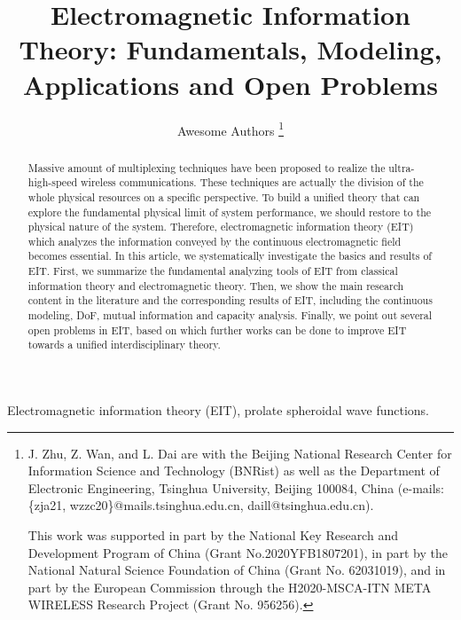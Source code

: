 \documentclass[journal,twocolumn]{IEEEtran}
\begin{document}
\title{Electromagnetic Information Theory: Fundamentals, Modeling, Applications and Open Problems}

\author{{Awesome Authors}
\thanks{J. Zhu, Z. Wan, and L. Dai are with the Beijing National Research Center for Information Science and Technology (BNRist) as well as the Department of Electronic Engineering, Tsinghua University, Beijing 100084, China (e-mails: \{zja21, wzzc20\}@mails.tsinghua.edu.cn, daill@tsinghua.edu.cn).

This work was supported in part by the National Key Research and Development Program of China (Grant No.2020YFB1807201), in part by the National Natural Science Foundation of China (Grant No. 62031019), and in part by the European Commission through the H2020-MSCA-ITN META WIRELESS Research Project (Grant No. 956256).}
}

\maketitle

\begin{abstract}
   Massive amount of multiplexing techniques have been proposed to realize the ultra-high-speed wireless communications. These techniques are actually the division of the whole physical resources on a specific perspective. To build a unified theory that can explore the fundamental physical limit of system performance, we should restore to the physical nature of the system. Therefore, electromagnetic information theory (EIT) which analyzes the information conveyed by the continuous electromagnetic field becomes essential. In this article, we systematically investigate the basics and results of EIT. First, we summarize the fundamental analyzing tools of EIT from classical information theory and electromagnetic theory. Then, we show the main research content in the literature and the corresponding results of EIT, including the continuous modeling, DoF, mutual information and capacity analysis. Finally, we point out several open problems in EIT, based on which further works can be done to improve EIT towards a unified interdisciplinary theory.
\end{abstract}

\begin{IEEEkeywords}
    Electromagnetic information theory (EIT), prolate spheroidal wave functions. 
\end{IEEEkeywords}
\end{document}
